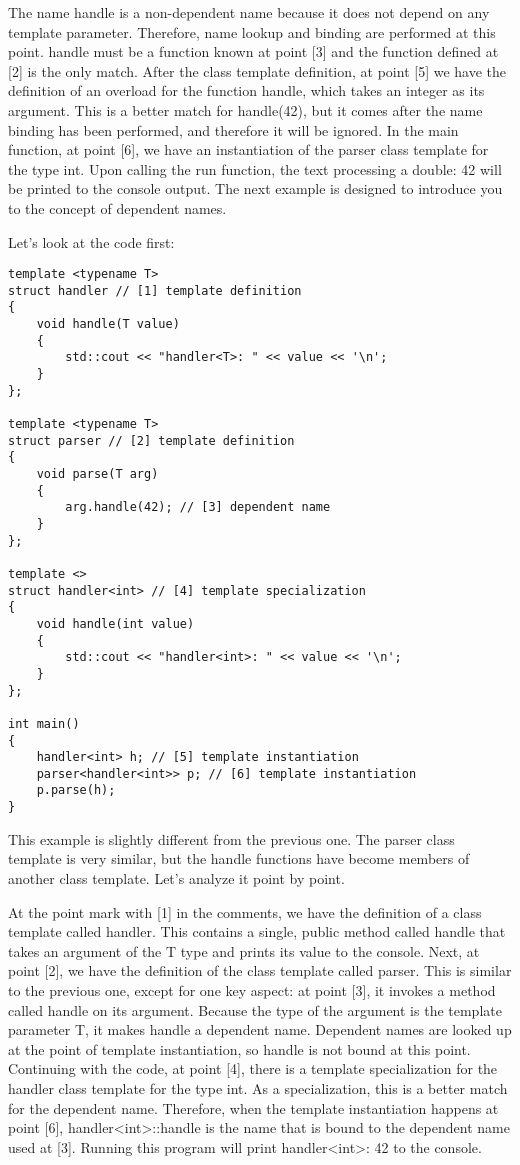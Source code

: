 The name handle is a non-dependent name because it does not depend on any template parameter. Therefore, name lookup and binding are performed at this point. handle must be a function known at point [3] and the function defined at [2] is the only match. After the class template definition, at point [5] we have the definition of an overload for the function handle, which takes an integer as its argument. This is a better match for handle(42), but it comes after the name binding has been performed, and therefore it will be ignored. In the main function, at point [6], we have an instantiation of the parser class template for the type int. Upon calling the run function, the text processing a double: 42 will be printed to the console output.
The next example is designed to introduce you to the concept of dependent names.

Let’s look at the code first:

\begin{lstlisting}[style=styleCXX]
template <typename T>
struct handler // [1] template definition
{
	void handle(T value)
	{
		std::cout << "handler<T>: " << value << '\n';
	}
};

template <typename T>
struct parser // [2] template definition
{
	void parse(T arg)
	{
		arg.handle(42); // [3] dependent name
	}
};

template <>
struct handler<int> // [4] template specialization
{
	void handle(int value)
	{
		std::cout << "handler<int>: " << value << '\n';
	}
};

int main()
{
	handler<int> h; // [5] template instantiation
	parser<handler<int>> p; // [6] template instantiation
	p.parse(h);
}
\end{lstlisting}

This example is slightly different from the previous one. The parser class template is very similar, but the handle functions have become members of another class template. Let’s analyze it point by point.

At the point mark with [1] in the comments, we have the definition of a class template called handler. This contains a single, public method called handle that takes an argument of the T type and prints its value to the console. Next, at point [2], we have the definition of the class template called parser. This is similar to the previous one, except for one key aspect: at point [3], it invokes a method called handle on its argument. Because the type of the argument is the template parameter T, it makes handle a dependent name. Dependent names are looked up at the point of template instantiation, so handle is not bound at this point. Continuing with the code, at point [4], there is a template specialization for the handler class template for the type int. As a specialization, this is a better match for the dependent name. Therefore, when the template instantiation happens at point [6], handler<int>::handle is the name that is bound to the dependent name used at [3]. Running this program will print handler<int>: 42 to the console.

